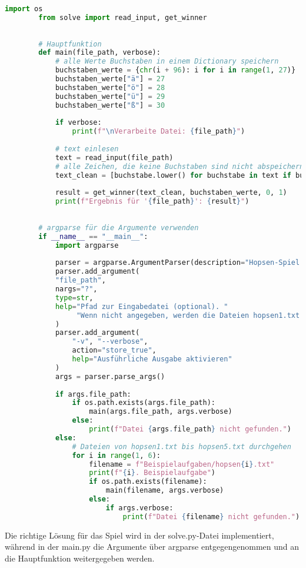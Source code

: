 \documentclass[a4paper,10pt,ngerman]{scrartcl}
\begin{document}
	\begin{lstlisting}[language=Python]
		import os
		from solve import read_input, get_winner
		
		
		# Hauptfunktion
		def main(file_path, verbose):
			# alle Werte Buchstaben in einem Dictionary speichern
			buchstaben_werte = {chr(i + 96): i for i in range(1, 27)}
			buchstaben_werte["ä"] = 27
			buchstaben_werte["ö"] = 28
			buchstaben_werte["ü"] = 29
			buchstaben_werte["ß"] = 30
			
			if verbose:
				print(f"\nVerarbeite Datei: {file_path}")
			
			# text einlesen
			text = read_input(file_path)
			# alle Zeichen, die keine Buchstaben sind nicht abspeichern und alle Buchstaben zu kleinen Buchstaben umwandeln
			text_clean = [buchstabe.lower() for buchstabe in text if buchstabe.isalpha()]
			
			result = get_winner(text_clean, buchstaben_werte, 0, 1)
			print(f"Ergebnis für '{file_path}': {result}")
			
		
		# argparse für die Argumente verwenden
		if __name__ == "__main__":
			import argparse
			
			parser = argparse.ArgumentParser(description="Hopsen-Spiel zwischen Amira und Bela.")
			parser.add_argument(
			"file_path",
			nargs="?",
			type=str,
			help="Pfad zur Eingabedatei (optional). "
				 "Wenn nicht angegeben, werden die Dateien hopsen1.txt bis hopsen5.txt durchlaufen.",
			)
			parser.add_argument(
				"-v", "--verbose",
				action="store_true",
				help="Ausführliche Ausgabe aktivieren"
			)
			args = parser.parse_args()
			
			if args.file_path:
				if os.path.exists(args.file_path):
					main(args.file_path, args.verbose)
				else:
					print(f"Datei {args.file_path} nicht gefunden.")
			else:
				# Dateien von hopsen1.txt bis hopsen5.txt durchgehen
				for i in range(1, 6):
					filename = f"Beispielaufgaben/hopsen{i}.txt"
					print(f"{i}. Beispielaufgabe")
					if os.path.exists(filename):
						main(filename, args.verbose)
					else:
						if args.verbose:
							print(f"Datei {filename} nicht gefunden.")

	\end{lstlisting}
	
	Die richtige Lösung für das Spiel wird in der solve.py-Datei implementiert, während in der main.py die Argumente über argparse entgegengenommen und an die Hauptfunktion weitergegeben werden.
	
\end{document}

